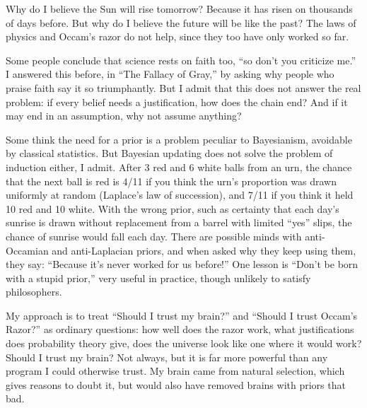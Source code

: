 
Why do I believe the Sun will rise tomorrow? Because it has risen on thousands of days before. But why do I believe the future will be like the past? The laws of physics and Occam's razor do not help, since they too have only worked so far. 

Some people conclude that science rests on faith too, ``so don't you criticize me.'' I answered this before, in ``The Fallacy of Gray,'' by asking why people who praise faith say it so triumphantly. But I admit that this does not answer the real problem: if every belief needs a justification, how does the chain end? And if it may end in an assumption, why not assume anything? 

Some think the need for a prior is a problem peculiar to Bayesianism, avoidable by classical statistics. But Bayesian updating does not solve the problem of induction either, I admit. After 3 red and 6 white balls from an urn, the chance that the next ball is red is 4/11 if you think the urn's proportion was drawn uniformly at random (Laplace's law of succession), and 7/11 if you think it held 10 red and 10 white. With the wrong prior, such as certainty that each day's sunrise is drawn without replacement from a barrel with limited ``yes'' slips, the chance of sunrise would fall each day. There are possible minds with anti-Occamian and anti-Laplacian priors, and when asked why they keep using them, they say: ``Because it's never worked for us before!'' One lesson is ``Don't be born with a stupid prior,'' very useful in practice, though unlikely to satisfy philosophers. 

My approach is to treat ``Should I trust my brain?'' and ``Should I trust Occam's Razor?'' as ordinary questions: how well does the razor work, what justifications does probability theory give, does the universe look like one where it would work? Should I trust my brain? Not always, but it is far more powerful than any program I could otherwise trust. My brain came from natural selection, which gives reasons to doubt it, but would also have removed brains with priors that bad. 


